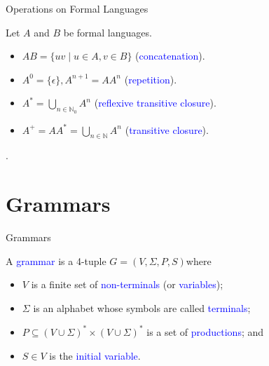 \documentclass{beamer}
\def\b{\textcolor{blue}}
\begin{document}
\begin{frame}{Operations on Formal Languages}
    \begin{definition}
        Let $A$ and $B$ be formal languages.
        \begin{itemize}
            \item $AB = \{uv \mid u \in A, v \in B\}$ (\b{concatenation}).\pause
            \item $A^0 = \{\epsilon\}, A^{n+1} = AA^n$ (\b{repetition}).\pause
            \item $A^* = \bigcup_{n \in \mathbb{N}_0} A^n$ (\b{reflexive transitive closure}).\pause
            \item $A^+ = AA^* = \bigcup_{n \in \mathbb{N}} A^n$ (\b{transitive closure}).
        \end{itemize}.
    \end{definition}
\end{frame}

\section{Grammars}

\begin{frame}{Grammars}
    \begin{definition}
        A \b{grammar} is a 4-tuple $G = (V, \Sigma, P, S)$\pause where
        \begin{itemize}
            \item $V$ is a finite set of \b{non-terminals} (or \b{variables})\pause;
            \item $\Sigma$ is an alphabet whose symbols are called \b{terminals}\pause;
            \item $P \subseteq (V \cup \Sigma)^* \times (V \cup \Sigma)^*$ is a set of \b{productions}\pause; and
            \item $S \in V$ is the \b{initial variable}.
        \end{itemize}
    \end{definition}
\end{frame}
\end{document}
